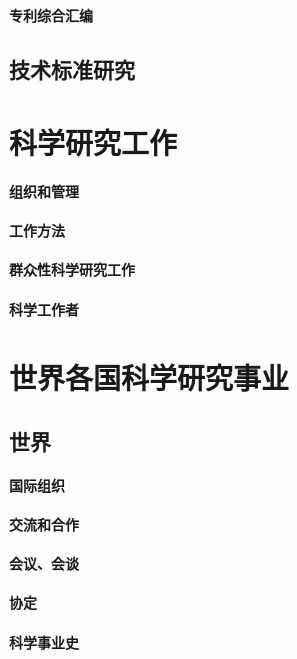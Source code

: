 \documentclass[UTF8]{../../ApplicationUniverse}
\begin{document}
    \subsubsection{专利综合汇编}
\section{技术标准研究}




\chapter{科学研究工作}
\subsubsection{组织和管理}
\subsubsection{工作方法}
\subsubsection{群众性科学研究工作}
\subsubsection{科学工作者}


\chapter{世界各国科学研究事业}
\section{世界}
    \subsubsection{国际组织}
    \subsubsection{交流和合作}
    \subsubsection{会议、会谈}
    \subsubsection{协定}
    \subsubsection{科学事业史}
\end{document}

